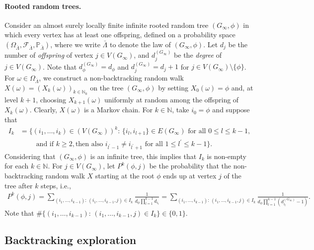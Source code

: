 \documentclass[11pt]{article}
\numberwithin{equation}{section}
\theoremstyle{plain}
\newcommand{\N}{\mathbb N}
\renewcommand{\P}{\mathbb P}
\begin{document}

\paragraph{Rooted random trees.} 

Consider an almost surely locally finite infinite rooted random tree $(G_{\infty},\phi)$ in which every vertex has at least one offspring, defined on a probability space $(\Omega_{\bar{\Lambda}},\mathcal{F}_{\bar{\Lambda}},\P_{\bar{\Lambda}})$, where we write $\bar{\Lambda}$ to denote the law of $(G_{\infty},\phi)$. Let $d_{j}$ be the number of \emph{offspring} of vertex $j \in V(G_{\infty})$, and $d^{(G_\infty)}_{j}$ be the \emph{degree} of $j \in V(G_{\infty})$. Note that $d^{(G_\infty)}_{\phi} = d_{\phi}$ and $d^{(G_\infty)}_{j} = d_{j}+1$ for $j\in V(G_{\infty})\setminus\{\phi\}$. For $\omega\in\Omega_{\bar{\Lambda}}$, we construct a non-backtracking random walk $X(\omega) = (X_{k}(\omega))_{k\in\N_0}$ on the tree $(G_{\infty},\phi)$ by setting $X_{0}(\omega)=\phi$ and, at level $k+1$, choosing $X_{k+1}(\omega)$ uniformly at random among the offspring of $X_{k}(\omega)$. Clearly, $X(\omega)$ is a Markov chain. For $k\in\N$, take $i_{0}=\phi$ and suppose that
\begin{align*}
I_{k} &= \Big\{(i_{1},\ldots ,i_{k})\in (V(G_{\infty}))^{k}\colon\, 
\{i_{l} ,i_{l+1}\} \in E(G_{\infty})\text{ for all }0\leq l\leq k-1,\\
&\quad\quad \text{ and if } k\geq 2, \text{then also }i_{l^\prime -1}\neq i_{l^\prime +1} \text{ for all } 1\leq l^{\prime}
\leq k-1\Big\}.
\end{align*}
Considering that $(G_{\infty},\phi)$ is an infinite tree, this implies that $I_{k}$ is non-empty for each $k\in\N$. For $j \in V(G_{\infty})$, let $P^{k}(\phi,j)$ be the probability that the non-backtracking random walk $X$ starting at the root $\phi$ ends up at vertex $j$ of the tree after $k$ steps, i.e.,
\begin{align*}
P^{k}(\phi, j) = \sum_{(i_{1},\ldots, i_{k-1}):\,(i_{1},\ldots,i_{k-1},j)\in I_{k}} \frac{1}{d_{\phi}
\prod_{l=1}^{k-1}d_{i_{l}}} = \sum_{(i_{1},\ldots, i_{k-1}):\,(i_{1},\ldots,i_{k-1},j)\in I_{k}} \frac{1}{d_{\phi}
\prod_{l=1}^{k-1}(d^{(G_\infty)}_{i_{l}}-1)}.
\end{align*}
Note that $\#\{(i_{1},\ldots, i_{k-1})\colon\,(i_{1},\ldots,i_{k-1},j)\in I_{k}\}\in\{0,1\}$.


\subsection{Backtracking exploration} 
\label{subsec:FPHL2}
\end{document}
